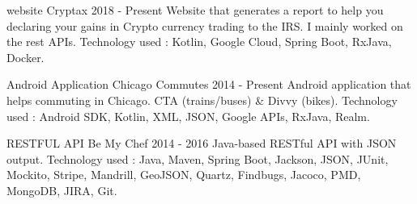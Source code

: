 

\begin{cventries}

  \projectentry
    {website} %
    {Cryptax} %
    {2018 - Present} %
    {Website that generates a report to help you declaring your gains in Crypto currency trading to the IRS. I mainly worked on the rest APIs.\linebreak
Technology used : Kotlin, Google Cloud, Spring Boot, RxJava, Docker.\linebreak
{}\linebreak
{}
    }
    
  \projectentry
    {Android Application} %
    {Chicago Commutes} %
    {2014 - Present} %
    {Android application that helps commuting in Chicago. CTA (trains/buses) \& Divvy (bikes).\linebreak
Technology used : Android SDK, Kotlin, XML, JSON, Google APIs, RxJava, Realm.\linebreak
{}\linebreak
{}
    }


\projectentry
  	{RESTFUL API} %
  	{Be My Chef} %
  	{2014 - 2016} %
    {Java-based RESTful API with JSON output.\linebreak
Technology used : Java, Maven, Spring Boot, Jackson, JSON, JUnit, Mockito, Stripe, Mandrill, GeoJSON, Quartz, Findbugs, Jacoco, PMD, MongoDB, JIRA, Git.\linebreak
{}
    }

    

\end{cventries}
